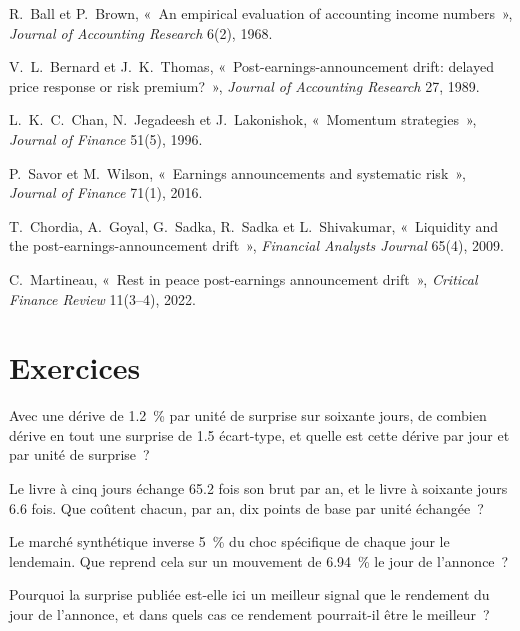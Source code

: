 \begin{omsources}
\item R.~Ball et P.~Brown, «~An empirical evaluation of accounting income numbers~», \emph{Journal of Accounting Research} 6(2), 1968.
\item V.~L.~Bernard et J.~K.~Thomas, «~Post-earnings-announcement drift: delayed price response or risk premium?~», \emph{Journal of Accounting Research}
27, 1989.
\item L.~K.~C.~Chan, N.~Jegadeesh et J.~Lakonishok, «~Momentum strategies~», \emph{Journal of Finance} 51(5), 1996.
\item P.~Savor et M.~Wilson, «~Earnings announcements and systematic risk~», \emph{Journal of Finance} 71(1), 2016.
\item T.~Chordia, A.~Goyal, G.~Sadka, R.~Sadka et L.~Shivakumar, «~Liquidity and the post-earnings-announcement drift~», \emph{Financial Analysts
Journal} 65(4), 2009.
\item C.~Martineau, «~Rest in peace post-earnings announcement drift~», \emph{Critical Finance Review} 11(3--4), 2022.
\end{omsources}

\section{Exercices}

\begin{exercise}[$\star$]\label{exo:s1:earnings:1}
Avec une dérive de 1.2~\% par unité de surprise sur soixante jours, de combien dérive en tout une surprise de 1.5 écart-type, et quelle est cette dérive
par jour et par unité de surprise~?
\end{exercise}

\begin{exercise}[$\star$]\label{exo:s1:earnings:2}
Le livre à cinq jours échange 65.2 fois son brut par an, et le livre à soixante jours 6.6 fois. Que coûtent chacun, par an, dix points de base par unité échangée~?
\end{exercise}

\begin{exercise}[$\star$]\label{exo:s1:earnings:3}
Le marché synthétique inverse 5~\% du choc spécifique de chaque jour le lendemain. Que reprend cela sur un mouvement de 6.94~\% le jour de l'annonce~?
\end{exercise}

\begin{exercise}[$\star\star$]\label{exo:s1:earnings:4}
Pourquoi la surprise publiée est-elle ici un meilleur signal que le rendement du jour de l'annonce, et dans quels cas ce rendement pourrait-il être le meilleur~?
\end{exercise}

